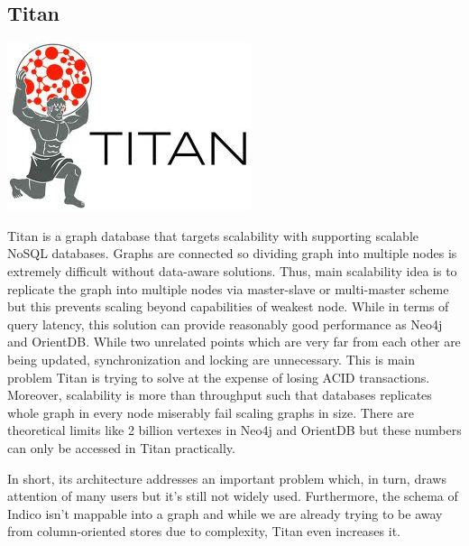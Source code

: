 \subsection{Titan}

\vspace{-1.15cm} \hspace{3cm} \includegraphics[scale=0.2]{3/figures/titan.jpg}

Titan is a graph database that targets scalability with supporting scalable NoSQL databases. Graphs are connected so dividing graph into multiple nodes is extremely difficult without data-aware solutions. Thus, main scalability idea is to replicate the graph into multiple nodes via master-slave or multi-master scheme but this prevents scaling beyond capabilities of weakest node. While in terms of query latency, this solution can provide reasonably good performance as Neo4j and OrientDB. While two unrelated points which are very far from each other are being updated, synchronization and locking are unnecessary. This is main problem Titan is trying to solve at the expense of losing ACID transactions. Moreover, scalability is more than throughput such that databases replicates whole graph in every node miserably fail scaling graphs in size. There are theoretical limits like 2 billion vertexes in Neo4j and OrientDB but these numbers can only be accessed in Titan practically.

In short, its architecture addresses an important problem which, in turn, draws attention of many users but it's still not widely used. Furthermore, the schema of Indico isn't mappable into a graph and while we are already trying to be away from column-oriented stores due to complexity, Titan even increases it.


